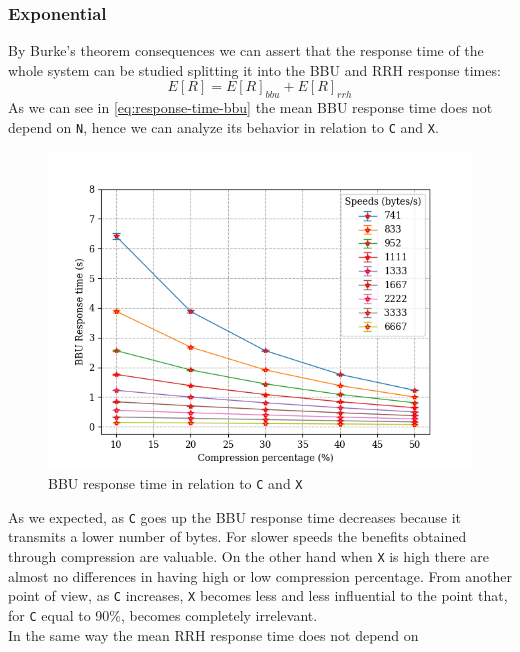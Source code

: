 \documentclass[11pt,a4paper,oneside, openright]{article}
\begin{document}
\subsubsection{Exponential}
By Burke's theorem consequences we can assert that the response time of the whole system can be studied splitting it into the BBU and RRH response times:
\begin{equation}
E[R] = E[R]_{bbu} + E[R]_{rrh}
\end{equation} 
As we can see in \ref{eq:response-time-bbu} the mean BBU response time does not depend on \texttt{N}, hence we can analyze its behavior in relation to \texttt{C} and \texttt{X}.
\begin{figure}[h]
	\centering
	\includegraphics[width=\textwidth]{images/c-vs-response-time-bbu-exp}
	\caption{BBU response time in relation to \texttt{C} and \texttt{X}}
	\label{fig:c-vs-response-time-bbu}
\end{figure}
As we expected, as \texttt{C} goes up the BBU response time decreases because it transmits a lower number of bytes. For slower speeds the benefits obtained through compression are valuable. On the other hand when \texttt{X} is high there are almost no differences in having high or low compression percentage. %
From another point of view, as \texttt{C} increases, \texttt{X} becomes less and less influential to the point that, for \texttt{C} equal to 90\%, becomes completely irrelevant.\\
In the same way the mean RRH response time does not depend on 
\end{document}
